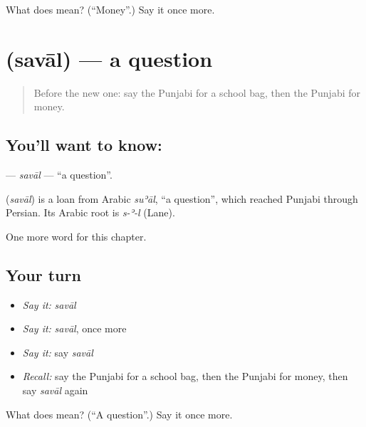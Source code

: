 \begin{tcolorbox}[breakable,colback=teal!4,colframe=teal!35!black,title={Before you move on}]
What does  mean? (\textquotedblleft{}Money\textquotedblright{}.) Say it once more.
\end{tcolorbox}
\section[\texorpdfstring{\pa{ਸਵਾਲ} (savāl)}{ਸਵਾਲ (savāl)}]{ (savāl) — a question}

\label{lesson:PA-C72-saval}



\begin{quote}
Before the new one: say the Punjabi for a school bag, then the Punjabi for money.
\end{quote}

\subsection*{You'll want to know: }
\textbf{} — \emph{savāl} — \textquotedblleft{}a question\textquotedblright{}.

\begin{cousinweb}
\textbf{} (\emph{savāl}) is a loan from Arabic \emph{suʾāl}, \textquotedblleft{}a question\textquotedblright{}, which reached Punjabi through Persian. Its Arabic root is \emph{s-ʾ-l} (Lane).
\end{cousinweb}

\begin{grammarlens}[title={What you've built}]
One more word for this chapter.
\end{grammarlens}

\subsection*{Your turn}
\begin{itemize}
\raggedright
  \item \emph{Say it:} \emph{savāl}
  \item \emph{Say it:} \emph{savāl}, once more
  \item \emph{Say it:} say \emph{savāl}
  \item \emph{Recall:} say the Punjabi for a school bag, then the Punjabi for money, then say \emph{savāl} again
\end{itemize}

\begin{tcolorbox}[breakable,colback=teal!4,colframe=teal!35!black,title={Before you move on}]
What does  mean? (\textquotedblleft{}A question\textquotedblright{}.) Say it once more.
\end{tcolorbox}
